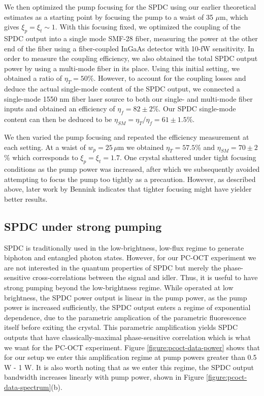 We then optimized the pump focusing for the SPDC using our earlier theoretical estimates as a starting point by focusing the pump to a waist of 35 $\mu$m, which gives $\xi_p = \xi_t \sim 1$. With this focusing fixed, we optimized the coupling of the SPDC output into a single mode SMF-28 fiber, measuring the power at the other end of the fiber using a fiber-coupled InGaAs detector with 10-fW sensitivity. In order to measure the coupling efficiency, we also obtained the total SPDC output power by using a multi-mode fiber in its place. Using this initial setting, we obtained a ratio of $\eta_T = 50$\%. However, to account for the coupling losses and deduce the actual single-mode content of the SPDC output, we connected a single-mode 1550 nm fiber laser source to both our single- and multi-mode fiber inputs and obtained an efficiency of $\eta_{f} = 82 \pm 2$\%. Our SPDC single-mode content can then be deduced to be $\eta_{SM} = \eta_{T}/\eta_{f} = 61 \pm 1.5$\%.

We then varied the pump focusing and repeated the efficiency measurement at each setting. At a waist of $w_p = 25\,\mu$m we obtained $\eta_T = 57.5$\% and $\eta_{SM} = 70 \pm 2$\% which corresponds to $\xi_p = \xi_t = 1.7$. One crystal shattered under tight focusing conditions as the pump power was increased, after which we subsequently avoided attempting to focus the pump too tightly as a precaution. However, as described above, later work by Bennink \cite{bennink-optimal} indicates that tighter focusing might have yielder better results.

\subsection{SPDC under strong pumping}

SPDC is traditionally used in the low-brightness, low-flux regime to generate biphoton and entangled photon states. However, for our PC-OCT experiment we are not interested in the quantum properties of SPDC but merely the phase-sensitive cross-correlations between the signal and idler. Thus, it is useful to have strong pumping beyond the low-brightness regime. While operated at low brightness, the SPDC power output is linear in the pump power, as the pump power is increased sufficiently, the SPDC output enters a regime of exponential dependence, due to the parametric amplication of the parametric fluorescence itself before exiting the crystal. This parametric amplification yields SPDC outputs that have classically-maximal phase-sensitive correlation which is what we want for the PC-OCT experiment. Figure \ref{figure:pcoct-data-power} shows that for our setup we enter this amplification regime at pump powers greater than 0.5 W - 1 W. It is also worth noting that as we enter this regime, the SPDC output bandwidth increases linearly with pump power, shown in Figure \ref{figure:pcoct-data-spectrum}(b).


